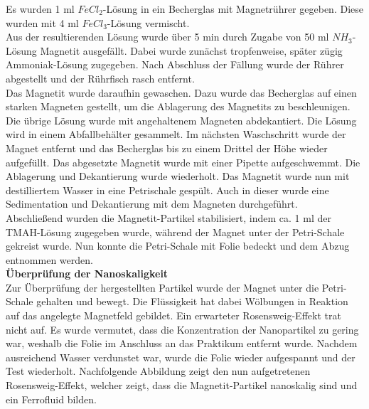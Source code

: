 \documentclass[a4paper]{TUBAFprotokoll}
\begin{document}
		Es wurden 1 ml $FeCl_2$-Lösung in ein Becherglas mit Magnetrührer gegeben. Diese wurden mit 4 ml $FeCl_3$-Lösung vermischt.\\
		Aus der resultierenden Lösung wurde über 5 min durch Zugabe von 50 ml $NH_3$-Lösung Magnetit ausgefällt. Dabei wurde zunächst tropfenweise, später zügig Ammoniak-Lösung zugegeben. Nach Abschluss der Fällung wurde der Rührer abgestellt und der Rührfisch rasch entfernt. \\
		Das Magnetit wurde daraufhin gewaschen. Dazu wurde das Becherglas auf einen starken Magneten gestellt, um die Ablagerung des Magnetits zu beschleunigen. Die übrige Lösung wurde mit angehaltenem Magneten abdekantiert. Die Lösung wird in einem Abfallbehälter gesammelt. Im nächsten Waschschritt wurde der Magnet entfernt und das Becherglas bis zu einem Drittel der Höhe wieder aufgefüllt. Das abgesetzte Magnetit wurde mit einer Pipette aufgeschwemmt. Die Ablagerung und Dekantierung wurde wiederholt. Das Magnetit wurde nun mit destilliertem Wasser in eine Petrischale gespült. Auch in dieser wurde eine Sedimentation und Dekantierung mit dem Magneten durchgeführt. \\
		Abschließend wurden die Magnetit-Partikel stabilisiert, indem ca. 1 ml der TMAH-Lösung zugegeben wurde, während der Magnet unter der Petri-Schale gekreist wurde. Nun konnte die Petri-Schale mit Folie bedeckt und dem Abzug entnommen werden. \\
		\newline
		\textbf{Überprüfung der Nanoskaligkeit}\\
		Zur Überprüfung der hergestellten Partikel wurde der Magnet unter die Petri-Schale gehalten und bewegt. Die Flüssigkeit hat dabei Wölbungen in Reaktion auf das angelegte Magnetfeld gebildet. Ein erwarteter Rosensweig-Effekt trat nicht auf. Es wurde vermutet, dass die Konzentration der Nanopartikel zu gering war, weshalb die Folie im Anschluss an das Praktikum entfernt wurde. Nachdem ausreichend Wasser verdunstet war, wurde die Folie wieder aufgespannt und der Test wiederholt. Nachfolgende Abbildung zeigt den nun aufgetretenen Rosensweig-Effekt, welcher zeigt, dass die Magnetit-Partikel nanoskalig sind und ein Ferrofluid bilden.
	
\end{document}
